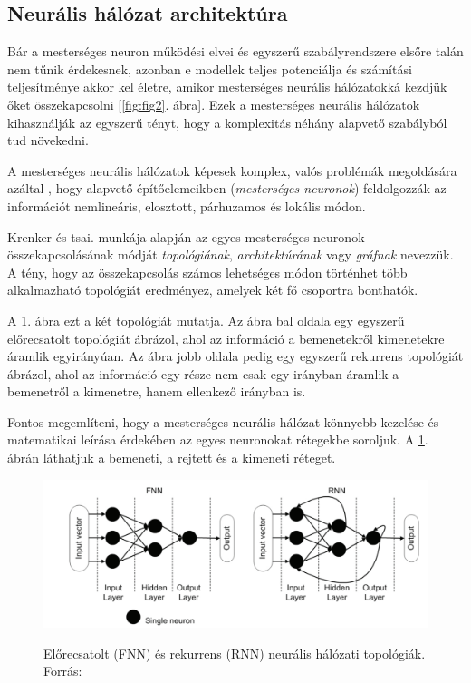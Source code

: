 \documentclass[12pt,a4]{article}
\begin{document}
	\subsection{Neurális hálózat architektúra}
	
	Bár a mesterséges neuron működési elvei és 
	egyszerű szabályrendszere elsőre talán nem tűnik érdekesnek, azonban e modellek teljes potenciálja és számítási teljesítménye akkor kel életre, 
	amikor mesterséges neurális hálózatokká
	kezdjük őket összekapcsolni [\ref{fig:fig2}. ábra]. 
	Ezek a mesterséges neurális hálózatok 
	kihasználják az egyszerű tényt, 
	hogy a komplexitás néhány alapvető
	szabályból tud növekedni.
	
	A mesterséges neurális hálózatok 
	képesek komplex, valós problémák megoldására azáltal
	, hogy 
	alapvető építőelemeikben (\textit{mesterséges neuronok}) feldolgozzák az információt nemlineáris,
	elosztott, párhuzamos és lokális módon.
	
	\cite{krenker}Krenker és tsai. 
	   munkája alapján az egyes mesterséges 
	neuronok összekapcsolásának módját 
	\textit{topológiának}, \textit{architektúrának} 
	vagy \textit{gráfnak} nevezzük. A tény, 
	hogy az összekapcsolás
	számos lehetséges módon történhet több alkalmazható topológiát eredményez, amelyek két fő csoportra bonthatók. 
	
	A \ref{fig:topologies}. ábra ezt a két topológiát mutatja. Az ábra bal oldala egy egyszerű előrecsatolt topológiát ábrázol, ahol az információ a bemenetekről kimenetekre áramlik egyirányúan. Az ábra jobb oldala pedig egy egyszerű rekurrens topológiát ábrázol, ahol az információ egy része nem csak egy irányban áramlik a bemenetről a kimenetre, hanem ellenkező irányban is.

	Fontos megemlíteni, hogy a mesterséges neurális hálózat könnyebb kezelése és matematikai leírása érdekében az egyes neuronokat rétegekbe soroljuk. A \ref{fig:topologies}. ábrán láthatjuk a bemeneti, a rejtett és a kimeneti réteget.
	\begin{figure}[h]	
		\centering
		\includegraphics[width=1\linewidth]{topologies}
        \label{fig:topologies}
		\caption{Előrecsatolt (FNN) és rekurrens (RNN) \newline\centering  neurális hálózati topológiák. 
			Forrás:\cite{krenker}}
	\end{figure}
\end{document}
